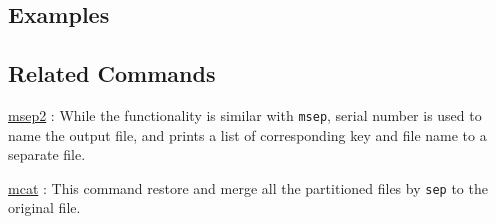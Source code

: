 \subsection*{Examples }


\subsection*{Related Commands}
\hyperref[sect:msep2]{msep2} : While the functionality is similar with \verb|msep|, serial number is used to name the output file, and prints a list of corresponding key and file name to a separate file. 

\hyperref[sect:mcat] {mcat} : This command restore and merge all the partitioned files by \verb|sep| to the original file.

%
